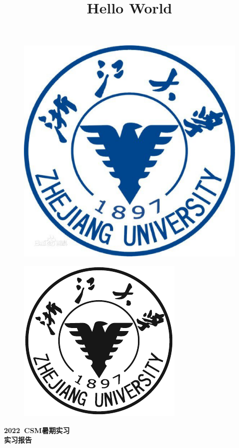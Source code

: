 \documentclass{ctexart}
\title{Hello World}
\begin{document}
\begin{titlepage}
        \vspace*{-2.5cm}
	
	\begin{figure}[h]
		\centering
		\includegraphics[width=0.7\linewidth]{zjdx}
	\end{figure}

	\begin{figure}[h]
		\centering
		\includegraphics[width=0.5\linewidth]{QSY}
	\end{figure}
	\vspace{-0.5cm}
	\begin{center}
		\Huge{\textbf{2022\ CSM暑期实习}}\\
		
		\Huge{\textbf{实习报告}}
	\end{center}
	
	
	\vspace*{1.5cm}


\end{titlepage}
\end{document}
